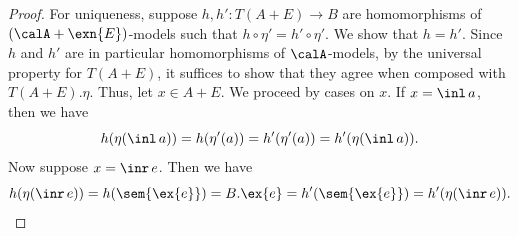 \begin{proof}
    For uniqueness, suppose $h, h' : T(A + E) \to B$ are homomorphisms of
    $(\calA + \exn{E})$-models such that $h \circ \eta' = h' \circ \eta'$. We
    show that $h = h'$. Since $h$ and $h'$ are in particular homomorphisms of
    $\calA$-models, by the universal property for $T(A + E)$, it suffices to
    show that they agree when composed with $T(A+E).\eta$. Thus, let $x \in A +
    E$. We proceed by cases on $x$. If $x = \inl\, a$, then we have
    \[ 
      h (\eta (\inl\, a)) 
      = h (\eta'(a)) 
      = h' (\eta'(a)) 
      = h' (\eta (\inl\, a)). 
    \]
    Now suppose $x = \inr\, e$. Then we have
    \[ 
      h (\eta (\inr\, e)) 
      = h(\sem{\ex{e}}) 
      = B.\ex{e} 
      = h'(\sem{\ex{e}}) 
      = h' (\eta (\inr\, e)).  
    \]

\end{proof}

